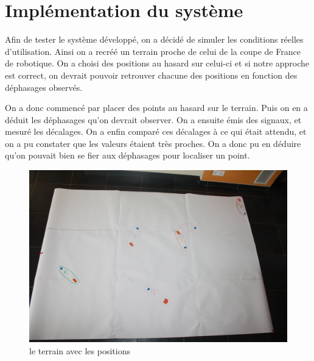 \documentclass[12pt,a4paper]{report}
\begin{document}
\chapter{Implémentation du système}
Afin de tester le système développé, on a décidé de simuler les conditions réelles d'utilisation.
Ainsi on a recréé un terrain proche de celui de la coupe de France de robotique. On a choisi des positions au hasard sur celui-ci et si notre approche est correct, on devrait pouvoir retrouver chacune des positions en fonction des déphasages observés.


On a donc commencé par placer des points au hasard sur le terrain. Puis on en a déduit les déphasages qu'on devrait observer. On a ensuite émis des signaux, et mesuré les décalages. On a enfin comparé ces décalages à ce qui était attendu, et on a pu constater que les valeurs étaient très proches. On a donc pu en déduire qu'on pouvait bien se fier aux déphasages pour localiser un point.
\begin{figure}[H]
\includegraphics[width=15cm]{../tests/simu_coupe_de_france_a_la_main/IMG_2732.JPG}
\caption{le terrain avec les positions}
\end{figure}
\end{document}
